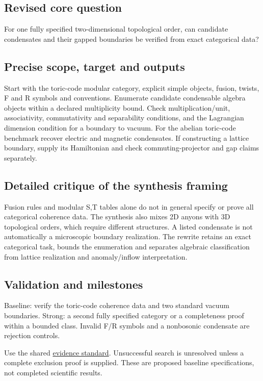 \documentclass[
  11pt,
]{article}
\begin{document}
\subsection{Revised core question}

For one fully specified two-dimensional topological order, can candidate
condensates and their gapped boundaries be verified from exact
categorical data?

\subsection{Precise scope, target and outputs}

Start with the toric-code modular category, explicit simple objects,
fusion, twists, F and R symbols and conventions. Enumerate candidate
condensable algebra objects within a declared multiplicity bound. Check
multiplication/unit, associativity, commutativity and separability
conditions, and the Lagrangian dimension condition for a boundary to
vacuum. For the abelian toric-code benchmark recover electric and
magnetic condensates. If constructing a lattice boundary, supply its
Hamiltonian and check commuting-projector and gap claims separately.

\subsection{Detailed critique of the synthesis framing}

Fusion rules and modular S,T tables alone do not in general specify or
prove all categorical coherence data. The synthesis also mixes 2D anyons
with 3D topological orders, which require different structures. A listed
condensate is not automatically a microscopic boundary realization. The
rewrite retains an exact categorical task, bounds the enumeration and
separates algebraic classification from lattice realization and
anomaly/inflow interpretation.

\subsection{Validation and milestones}

Baseline: verify the toric-code coherence data and two standard vacuum
boundaries. Strong: a second fully specified category or a completeness
proof within a bounded class. Invalid F/R symbols and a nonbosonic
condensate are rejection controls.

Use the shared
\href{https://github.com/rick-stevens-ai/Pure-Thought/blob/main/reviews/EVIDENCE-STANDARD.md}{evidence
standard}. Unsuccessful search is unresolved unless a complete exclusion
proof is supplied. These are proposed baseline specifications, not
completed scientific results.
\end{document}
